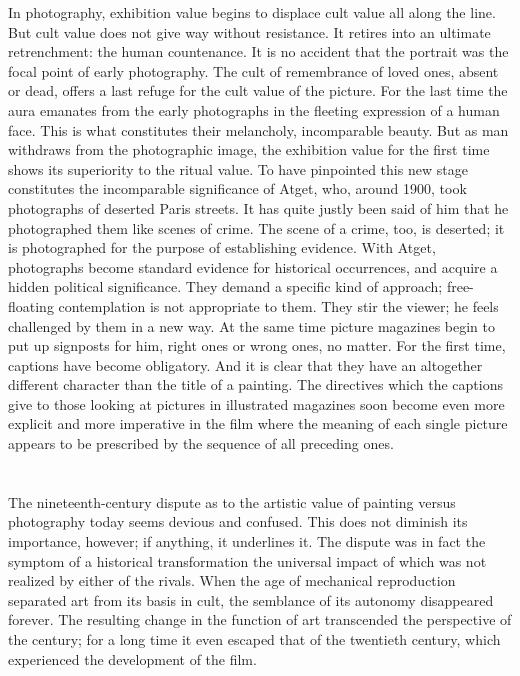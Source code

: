 \documentclass[11pt, letterpaper]{article}
\begin{document}
In photography, exhibition value begins to displace cult value all along the
line. But cult value does not give way without resistance. It retires into an
ultimate retrenchment: the human countenance. It is no accident that the
portrait was the focal point of early photography. The cult of remembrance of
loved ones, absent or dead, offers a last refuge for the cult value of the
picture. For the last time the aura emanates from the early photographs in the
fleeting expression of a human face. This is what constitutes their melancholy,
incomparable beauty. But as man withdraws from the photographic image, the
exhibition value for the first time shows its superiority to the ritual value.
To have pinpointed this new stage constitutes the incomparable significance of
Atget, who, around 1900, took photographs of deserted Paris streets. It has
quite justly been said of him that he photographed them like scenes of crime.
The scene of a crime, too, is deserted; it is photographed for the purpose of
establishing evidence. With Atget, photographs become standard evidence for
historical occurrences, and acquire a hidden political significance. They
demand a specific kind of approach; free-floating contemplation is not
appropriate to them. They stir the viewer; he feels challenged by them in a new
way. At the same time picture magazines begin to put up signposts for him,
right ones or wrong ones, no matter. For the first time, captions have become
obligatory. And it is clear that they have an altogether different character
than the title of a painting. The directives which the captions give to those
looking at pictures in illustrated magazines soon become even more explicit and
more imperative in the film where the meaning of each single picture appears to
be prescribed by the sequence of all preceding ones.

\section{}

The nineteenth-century dispute as to the artistic value of painting versus
photography today seems devious and confused. This does not diminish its
importance, however; if anything, it underlines it. The dispute was in fact the
symptom of a historical transformation the universal impact of which was not
realized by either of the rivals. When the age of mechanical reproduction
separated art from its basis in cult, the semblance of its autonomy disappeared
forever. The resulting change in the function of art transcended the
perspective of the century; for a long time it even escaped that of the
twentieth century, which experienced the development of the film.
\end{document}
